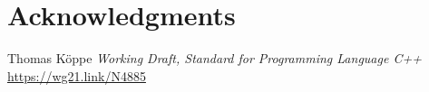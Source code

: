 \documentclass{wg21}
\begin{document}
%    
%        

\section{Acknowledgments}







\renewcommand{\section}[2]{}%
\begin{thebibliography}{9}
    
    Thomas Köppe
    \emph{Working Draft, Standard for Programming Language C++}\newline
    \url{https://wg21.link/N4885}
     
\end{thebibliography}
\end{document}
